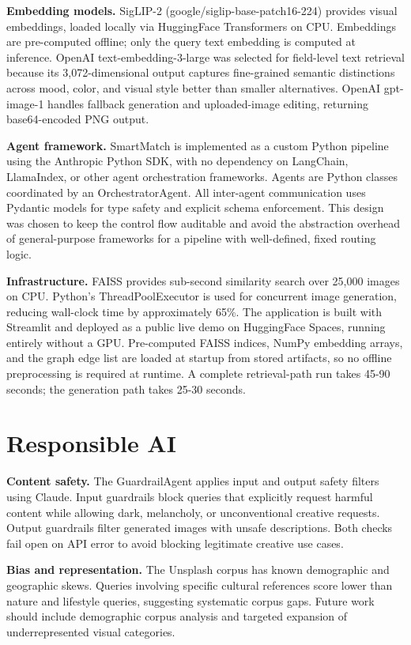 \documentclass[
  11pt,
]{article}
\begin{document}
\textbf{Embedding models.} SigLIP-2 (google/siglip-base-patch16-224)
provides visual embeddings, loaded locally via HuggingFace Transformers
on CPU. Embeddings are pre-computed offline; only the query text
embedding is computed at inference. OpenAI text-embedding-3-large was
selected for field-level text retrieval because its 3,072-dimensional
output captures fine-grained semantic distinctions across mood, color,
and visual style better than smaller alternatives. OpenAI gpt-image-1
handles fallback generation and uploaded-image editing, returning
base64-encoded PNG output.

\textbf{Agent framework.} SmartMatch is implemented as a custom Python
pipeline using the Anthropic Python SDK, with no dependency on
LangChain, LlamaIndex, or other agent orchestration frameworks. Agents
are Python classes coordinated by an OrchestratorAgent. All inter-agent
communication uses Pydantic models for type safety and explicit schema
enforcement. This design was chosen to keep the control flow auditable
and avoid the abstraction overhead of general-purpose frameworks for a
pipeline with well-defined, fixed routing logic.

\textbf{Infrastructure.} FAISS provides sub-second similarity search
over 25,000 images on CPU. Python's ThreadPoolExecutor is used for
concurrent image generation, reducing wall-clock time by approximately
65\%. The application is built with Streamlit and deployed as a public
live demo on HuggingFace Spaces, running entirely without a GPU.
Pre-computed FAISS indices, NumPy embedding arrays, and the graph edge
list are loaded at startup from stored artifacts, so no offline
preprocessing is required at runtime. A complete retrieval-path run
takes 45-90 seconds; the generation path takes 25-30 seconds.

\section{Responsible AI}\label{responsible-ai}

\textbf{Content safety.} The GuardrailAgent applies input and output
safety filters using Claude. Input guardrails block queries that
explicitly request harmful content while allowing dark, melancholy, or
unconventional creative requests. Output guardrails filter generated
images with unsafe descriptions. Both checks fail open on API error to
avoid blocking legitimate creative use cases.

\textbf{Bias and representation.} The Unsplash corpus has known
demographic and geographic skews. Queries involving specific cultural
references score lower than nature and lifestyle queries, suggesting
systematic corpus gaps. Future work should include demographic corpus
analysis and targeted expansion of underrepresented visual categories.
\end{document}
